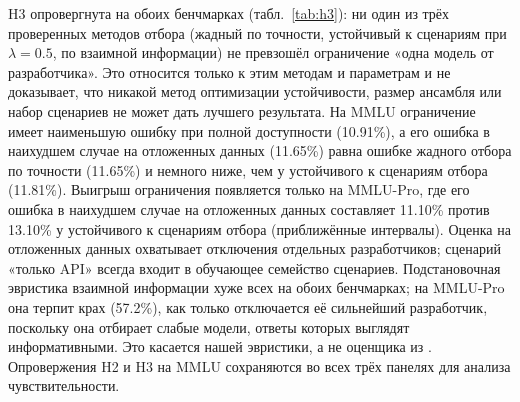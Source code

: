 \documentclass[preprint,12pt,authoryear]{elsarticle}
\begin{document}
H3 опровергнута на обоих бенчмарках (табл.~\ref{tab:h3}): ни один из трёх проверенных методов отбора (жадный по точности, устойчивый к сценариям при $\lambda = 0.5$, по взаимной информации) не превзошёл ограничение «одна модель от разработчика». Это относится только к этим методам и параметрам и не доказывает, что никакой метод оптимизации устойчивости, размер ансамбля или набор сценариев не может дать лучшего результата. На MMLU ограничение имеет наименьшую ошибку при полной доступности (10.91\%), а его ошибка в наихудшем случае на отложенных данных (11.65\%) равна ошибке жадного отбора по точности (11.65\%) и немного ниже, чем у устойчивого к сценариям отбора (11.81\%). Выигрыш ограничения появляется только на MMLU-Pro, где его ошибка в наихудшем случае на отложенных данных составляет 11.10\% против 13.10\% у устойчивого к сценариям отбора (приближённые интервалы). Оценка на отложенных данных охватывает отключения отдельных разработчиков; сценарий «только API» всегда входит в обучающее семейство сценариев. Подстановочная эвристика взаимной информации хуже всех на обоих бенчмарках; на MMLU-Pro она терпит крах (57.2\%), как только отключается её сильнейший разработчик, поскольку она отбирает слабые модели, ответы которых выглядят информативными. Это касается нашей эвристики, а не оценщика из \citet{turkmen2026}. Опровержения H2 и H3 на MMLU сохраняются во всех трёх панелях для анализа чувствительности.

\begin{table}[!htbp]
\centering
\caption{Отбор портфеля ($n=5$, относительное большинство): ошибка в \%, полная доступность и наихудший случай на отложенных данных при отключении с исключением одного разработчика (leave-one-developer-out). Значения для MMLU-Pro имеют приближённые интервалы.}
\label{tab:h3}
\small
{}
\end{table}
\end{document}
